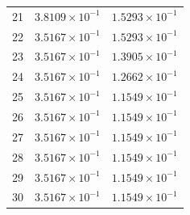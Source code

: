 \begin{table}[H]
\begin{tabular}{@{}rrr@{}}
21 & $3.8109\times10^{-1}$ & $1.5293\times10^{-1}$\\
22 & $3.5167\times10^{-1}$ & $1.5293\times10^{-1}$\\
23 & $3.5167\times10^{-1}$ & $1.3905\times10^{-1}$\\
24 & $3.5167\times10^{-1}$ & $1.2662\times10^{-1}$\\
25 & $3.5167\times10^{-1}$ & $1.1549\times10^{-1}$\\
26 & $3.5167\times10^{-1}$ & $1.1549\times10^{-1}$\\
27 & $3.5167\times10^{-1}$ & $1.1549\times10^{-1}$\\
28 & $3.5167\times10^{-1}$ & $1.1549\times10^{-1}$\\
29 & $3.5167\times10^{-1}$ & $1.1549\times10^{-1}$\\
30 & $3.5167\times10^{-1}$ & $1.1549\times10^{-1}$\\
\bottomrule
\end{tabular}
\end{table}

